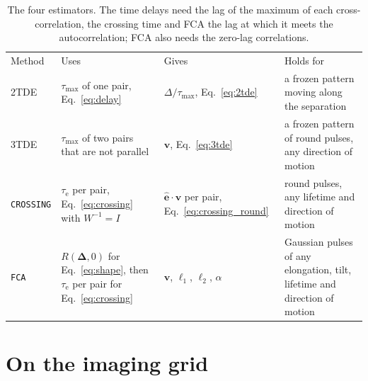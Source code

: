 \documentclass[aps,pre,11pt,a4paper,preprint,amsmath,amssymb,groupedaddress]{revtex4-2}
\newcommand{\Eqref}[1]{Eq.~\eqref{#1}}
\newcommand{\bv}{\ensuremath{\bm{v}}}
\newcommand{\bD}{\ensuremath{\bm{\Delta}}}
\newcommand{\be}{\ensuremath{\hat{\bm{e}}}}
\newcommand{\taue}{\ensuremath{\tau_\text{e}}}
\newcommand{\taumax}{\ensuremath{\tau_\text{max}}}
\newcommand{\Wi}{\ensuremath{W^{-1}}}
\newcommand{\code}[1]{\texttt{#1}}
\begin{document}
\begin{table}
\caption{The four estimators. The time delays need the lag of the maximum of each cross-correlation, the crossing time and FCA the lag at which it meets the autocorrelation; FCA also needs the zero-lag correlations.}
\label{tab:methods}
\begin{ruledtabular}
\begin{tabular}{lp{}p{}p{}}
Method & Uses & Gives & Holds for \\
\colrule
2TDE & \taumax{} of one pair, \Eqref{eq:delay} & $\Delta/\taumax$, \Eqref{eq:2tde} & a frozen pattern moving along the separation \\
3TDE & \taumax{} of two pairs that are not parallel & \bv, \Eqref{eq:3tde} & a frozen pattern of round pulses, any direction of motion \\
\code{CROSSING} & \taue{} per pair, \Eqref{eq:crossing} with $\Wi = I$ & $\be\cdot\bv$ per pair, \Eqref{eq:crossing_round} & round pulses, any lifetime and direction of motion \\
\code{FCA} & $R(\bD,0)$ for \Eqref{eq:shape}, then \taue{} per pair for \Eqref{eq:crossing} & \bv, $\ell_1$, $\ell_2$, $\alpha$ & Gaussian pulses of any elongation, tilt, lifetime and direction of motion \\
\end{tabular}
\end{ruledtabular}
\end{table}

\section{On the imaging grid}
\label{sec:grid}
\end{document}
